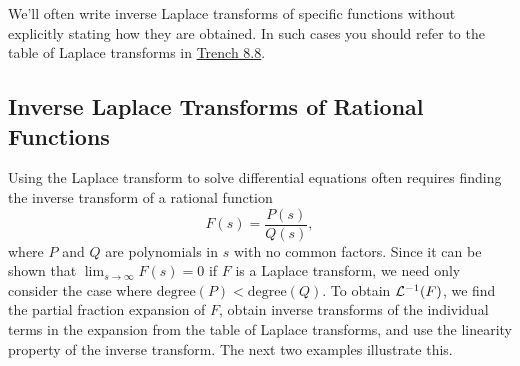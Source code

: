 \documentclass{ximera}
\begin{document}
\begin{remark}
We'll often write inverse Laplace transforms of specific
functions without explicitly stating how they are obtained. In such
cases you should refer to the table of Laplace transforms in \href{https://ximera.osu.edu/ode/main/laplaceTable/laplaceTable}{Trench 8.8}.
\end{remark}

\subsection*{Inverse Laplace Transforms of Rational Functions}

Using the Laplace transform to
 solve differential equations
often requires  finding the inverse
transform of a rational function
$$
F(s)=\frac{P(s)}{Q(s)},
$$
where $P$ and $Q$ are polynomials in $s$ with no common factors. Since
it can be shown that $\lim_{s\rightarrow\infty}F(s)=0$ if $F$ is a Laplace
transform, we need only consider the case where
$\mbox{degree}(P)<\mbox{degree}(Q)$. To obtain ${\cal L}^{-1}(F)$, we
find the partial fraction expansion of $F$, obtain inverse transforms
of the individual terms in the expansion from the table of Laplace
transforms, and use the linearity property of the inverse transform.
The next two examples illustrate this.
\end{document}
